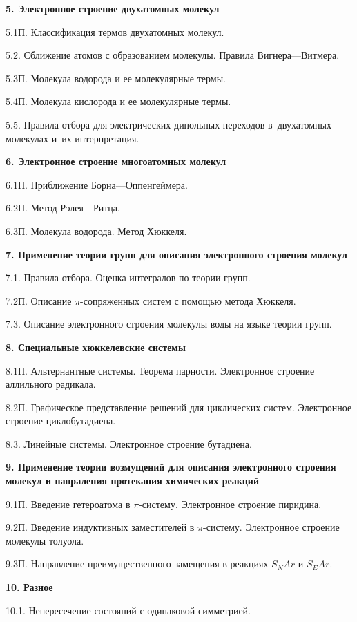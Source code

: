 \textbf{5. Электронное строение двухатомных молекул}\par
5.1П. Классификация термов двухатомных молекул.\par
5.2. Сближение атомов с образованием молекулы. Правила Вигнера—Витмера.\par
5.3П. Молекула водорода и ее молекулярные термы.\par
5.4П. Молекула кислорода и ее молекулярные термы.\par
5.5. Правила отбора для электрических дипольных переходов в~двухатомных молекулах и~их интерпретация.\par
\textbf{6. Электронное строение многоатомных молекул}\par
6.1П. Приближение Борна—Оппенгеймера.\par
6.2П. Метод Рэлея—Ритца.\par
6.3П. Молекула водорода. Метод Хюккеля.\par
\textbf{7. Применение теории групп для описания электронного строения молекул}\par
7.1. Правила отбора. Оценка интегралов по теории групп.\par
7.2П. Описание $\pi$-сопряженных систем с помощью метода Хюккеля.\par
7.3. Описание электронного строения молекулы воды на языке теории групп.\par
\textbf{8. Специальные хюккелевские системы}\par
8.1П. Альтернантные системы. Теорема парности. Электронное строение аллильного радикала.\par
8.2П. Графическое представление решений для циклических систем. Электронное строение циклобутадиена.\par
8.3. Линейные системы. Электронное строение бутадиена.\par
\textbf{9. Применение теории возмущений для описания электронного строения молекул и напраления протекания химических реакций}\par
9.1П. Введение гетероатома в $\pi$-систему. Электронное строение пиридина.\par
9.2П. Введение индуктивных заместителей в $\pi$-систему. Электронное строение молекулы толуола.\par
9.3П. Направление преимущественного замещения в реакциях $S_NAr$ и $S_EAr$.\par
\textbf{10. Разное}\par
10.1. Непересечение состояний с одинаковой симметрией.\par
